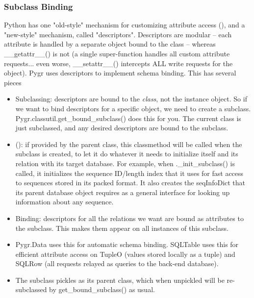 \documentclass{howto}
\begin{document}
\begin{itemize}
\subsubsection{Subclass Binding}
Python has one "old-style" mechanism for customizing attribute access
(), and a "new-style" mechanism, called "descriptors".
Descriptors are modular -- each attribute is handled by a separate object
bound to the class -- whereas __getattr__() is not (a single super-function
handles all custom attribute requests... even worse, __setattr__() intercepts
ALL write requests for the object).  Pygr uses descriptors to implement
schema binding.  This has several pieces
\begin{itemize}
\item Subclassing: descriptors are bound to the {\em class}, not the instance
object.  So if we want to bind descriptors for a specific object, we need to 
create a subclass.  Pygr.classutil.get_bound_subclass() does this for you.
The current class is just subclassed, and any desired descriptors are bound
to the subclass.

\item {}(): if provided by the parent class, 
this classmethod will be called when
the subclass is created, to let it do whatever it needs to initialize itself
and its relation with its target database.  For example, when 
._init_subclass() is called, it initializes
the sequence ID/length index that it uses for fast access to sequences
stored in its packed format.  It also creates the seqInfoDict that its
parent database object requires as a general interface for looking up
information about any sequence.

\item Binding: descriptors for all the relations we want are bound as
attributes to the subclass.  This makes them appear on all instances of this
subclass.

\item Pygr.Data uses this for automatic schema binding.  SQLTable uses this 
for efficient attribute access on TupleO (values stored locally as a tuple)
and SQLRow (all requests relayed as queries to the back-end database).

\item The subclass pickles as its parent class, which when unpickled
will be re-subclassed by get_bound_subclass() as usual.
\end{itemize}


\end{itemize}
\end{document}
